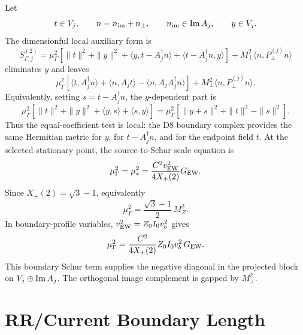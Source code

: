 \documentclass[11pt]{article}
\theoremstyle{definition}
\theoremstyle{remark}
\begin{document}
Let
\[
  t\in V_j,\qquad n=n_{\rm im}+n_\perp,\qquad
  n_{\rm im}\in{\rm Im}\,A_j,\qquad y\in V_j.
\]
The dimensionful local auxiliary form is
\[
  S_{\Gamma,j}^{(2)}
  =
  \mu_\Gamma^2
  \left[
  \|t\|^2+\|y\|^2+
  \langle y,t-A_j^\dagger n\rangle+
  \langle t-A_j^\dagger n,y\rangle
  \right]
  +M_\perp^2\langle n,P_\perp^{(j)}n\rangle
\]
eliminates \(y\) and leaves
\[
  \mu_\Gamma^2
  \left[
  \langle t,A_j^\dagger n\rangle+
  \langle n,A_jt\rangle-
  \langle n,A_jA_j^\dagger n\rangle
  \right]
  +M_\perp^2\langle n,P_\perp^{(j)}n\rangle .
\]
Equivalently, setting \(s=t-A_j^\dagger n\), the \(y\)-dependent part is
\[
  \mu_\Gamma^2
  \left[
  \|t\|^2+\|y\|^2+\langle y,s\rangle+\langle s,y\rangle
  \right]
  =
  \mu_\Gamma^2
  \left[
  \|y+s\|^2+\|t\|^2-\|s\|^2
  \right].
\]
Thus the equal-coefficient test is local: the D8 boundary complex provides
the same Hermitian metric for \(y\), for \(t-A_j^\dagger n\), and for
the endpoint field \(t\).
At the selected stationary point, the source-to-Schur scale equation is
\[
  \mu_\Gamma^2=\mu_*^2
  =
  \frac{C^2v_{\rm EW}^2}{4X_+(2)}G_{\rm EW}.
\]
Since \(X_+(2)=\sqrt3-1\), equivalently
\[
  \mu_\Gamma^2
  =
  \frac{\sqrt3+1}{2}\,M_Z^2.
\]
In boundary-profile variables, \(v_{\rm EW}^2=Z_0I_0v_b^2\) gives
\[
  \mu_\Gamma^2
  =
  \frac{C^2}{4X_+(2)}
  Z_0I_0v_b^2\,G_{\rm EW}.
\]
This boundary Schur term supplies the negative diagonal in the projected
block on \(V_j\oplus{\rm Im}\,A_j\).  The orthogonal image complement is
gapped by \(M_\perp^2\).


\section{RR/Current Boundary Length}
\end{document}
